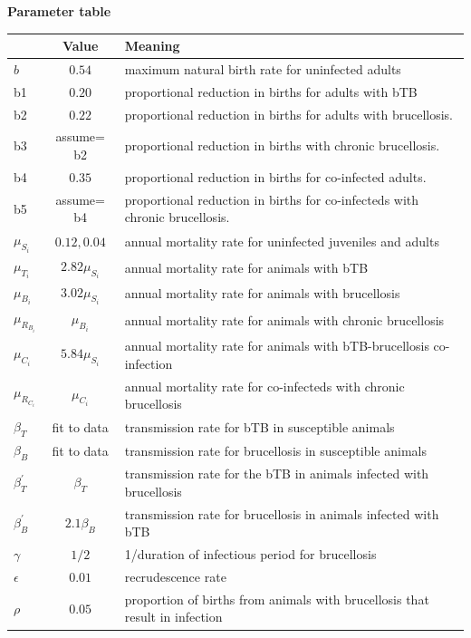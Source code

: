 \documentclass[letterpaper,12pt]{article}
\begin{document}
\pagebreak


\textbf{Parameter table}
\begin{table}[hb]
\newcommand{\head}[1]{\textnormal{\textbf{#1}}}
\small
\begin{tabular}{lcp{12cm}}
\hline
\head{ } & \head{Value} & \head{Meaning}\\
\hline
$b$ & $0.54$ &  maximum natural birth rate for uninfected adults  \\
b1 & $0.20$ &  proportional reduction in births for adults with bTB \\
b2 & $0.22$ & proportional reduction in births for adults with brucellosis.  \\
b3 & assume= b2 & proportional reduction in births with chronic brucellosis.  \\
b4 & $ 0.35 $ & proportional reduction in births for co-infected adults. \\
b5 & assume= b4 & proportional reduction in births for co-infecteds with chronic brucellosis.  \\
$\mu_{S_i} $ & $ 0.12, 0.04$ & annual mortality rate for uninfected juveniles and adults\\
$\mu_{T_i} $& $2.82 \mu_{S_i} $ & annual mortality rate for animals with bTB \\
$\mu_{B_i} $& $3.02 \mu_{S_i} $ & annual mortality rate for animals with brucellosis \\ 
$\mu_{R_{B_i}} $& $\mu_{B_i}$ & annual mortality rate for animals with chronic brucellosis \\ 
$\mu_{C_i}$ & $5.84 \mu_{S_i} $ & annual mortality rate for animals with bTB-brucellosis co-infection \\ 
$\mu_{R_{C_i}}$ &  $\mu_{C_i}$ & annual mortality rate for co-infecteds with chronic brucellosis \\ 
$\beta_T $ & fit to data & transmission rate for bTB in susceptible animals \\
$\beta_B $ & fit to data & transmission rate for brucellosis in susceptible animals \\
$\beta_{T}^{'}$ & $\beta_T$ & transmission rate for the bTB in animals infected with brucellosis \\
$\beta_{B}^{'}$ & $2.1 \beta_B$ & transmission rate for brucellosis in animals infected with bTB \\
$\gamma$& $ 1/2 $& 1/duration of infectious period for brucellosis \\
$\epsilon$& $0.01$ & recrudescence rate \\
$\rho$& $0.05$ & proportion of births from animals with brucellosis that result in infection \\
\hline 
\end{tabular}
\end{table}
\\
\pagebreak
\end{document}
